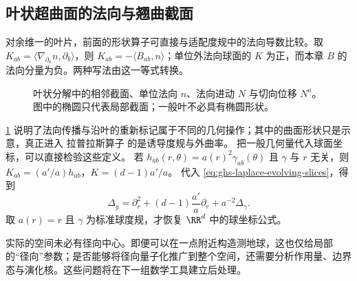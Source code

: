 \subsection{叶状超曲面的法向与翘曲截面}

对余维一的叶片，前面的形状算子可直接与适配度规中的法向导数比较。取 $K_{ab}=\langle\nabla_{\partial_a}n,\partial_b\rangle$，则 $K_{ab}=-\langle B_{ab},n\rangle$；单位外法向球面的 $K$ 为正，而本章 $B$ 的法向分量为负。两种写法由这一等式转换。

\begin{figure}[htbp]
\centering

\caption{叶状分解中的相邻截面、单位法向 $n$、法向进动 $N$ 与切向位移 $N^a$。图中的椭圆只代表局部截面；一般叶不必具有椭圆形状。}\label{fig:ghs-foliation-normals}
\end{figure}

\cref{fig:ghs-foliation-normals} 说明了法向传播与沿叶的重新标记属于不同的几何操作；其中的曲面形状只是示意，真正进入 拉普拉斯算子 的是诱导度规与外曲率。
把一般几何量代入球面坐标，可以直接检验这些定义。
若 $h_{ab}(r,\theta)=a(r)^2\gamma_{ab}(\theta)$ 且 $\gamma$ 与 $r$ 无关，则 $K_{ab}=(a'/a)h_{ab}$，$K=(d-1)a'/a$。
代入 \cref{eq:ghs-laplace-evolving-slices}，得到
\[
 \Delta_g=\partial_r^2+(d-1)\frac{a'}a\partial_r+a^{-2}\Delta_\gamma.
\]
取 $a(r)=r$ 且 $\gamma$ 为标准球度规，才恢复 $\RR^d$ 中的球坐标公式。

实际的空间未必有径向中心。即便可以在一点附近构造测地球，这也仅给局部的“径向”参数；是否能够将径向量子化推广到整个空间，还需要分析作用量、边界态与演化核。这些问题将在下一组数学工具建立后处理。
